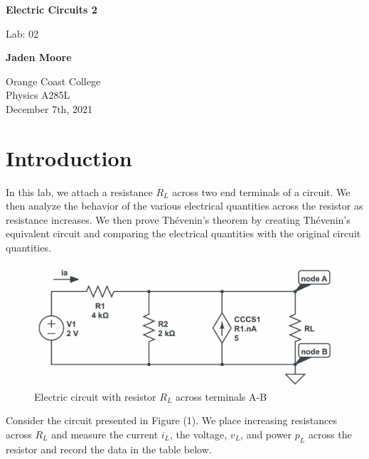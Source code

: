 \documentclass[12pt]{article}
\begin{document}

\begin{titlepage}
    \begin{center}
        \vspace*{1cm}
        \textbf{Electric Circuits 2}

        \vspace{0.5cm}
        Lab: 02

        \vspace{1cm}

        \textbf{Jaden Moore}

        \vfill

        Orange Coast College\\
        Physics A285L\\
        December 7th, 2021

    \end{center}
\end{titlepage}

\pagestyle{fancy}
\fancyhf{}
\setlength{\headheight}{15pt}
\cfoot{\thepage}

\section{Introduction}
In this lab, we attach a resistance $R_L$ across two end terminals of a circuit. We then analyze the behavior of the various electrical quantities across the resistor as resistance increases. We then prove Thévenin's theorem by creating Thévenin's equivalent circuit and comparing the electrical quantities with the original circuit quantities.
\begin{figure}[H]
    \begin{center}
        \includegraphics[scale=0.5]{circuit-1.png}
        \caption { Electric circuit with resistor $R_L$ across terminals A-B}
    \end{center}
\end{figure}
Consider the circuit presented in Figure (1). We place increasing resistances across $R_L$ and measure the current $i_L$, the voltage, $v_L$, and power $p_L$ across the resistor and record the data in the table below.
\end{document}
